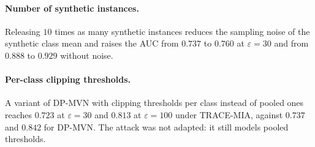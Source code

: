 \documentclass{article}
\newcommand{\dpmvn}{DP-MVN}
\newcommand{\ours}{TRACE-MIA}
\begin{document}
\paragraph{Number of synthetic instances.}
Releasing $10$ times as many synthetic instances reduces the sampling noise of the synthetic class mean and raises the AUC from $0.737$ to $0.760$ at $\varepsilon=30$ and from $0.888$ to $0.929$ without noise.

\paragraph{Per-class clipping thresholds.}
A variant of \dpmvn{} with clipping thresholds per class instead of pooled ones reaches $0.723$ at $\varepsilon=30$ and $0.813$ at $\varepsilon=100$ under \ours{}, against $0.737$ and $0.842$ for \dpmvn{}. The attack was not adapted: it still models pooled thresholds.
\end{document}
